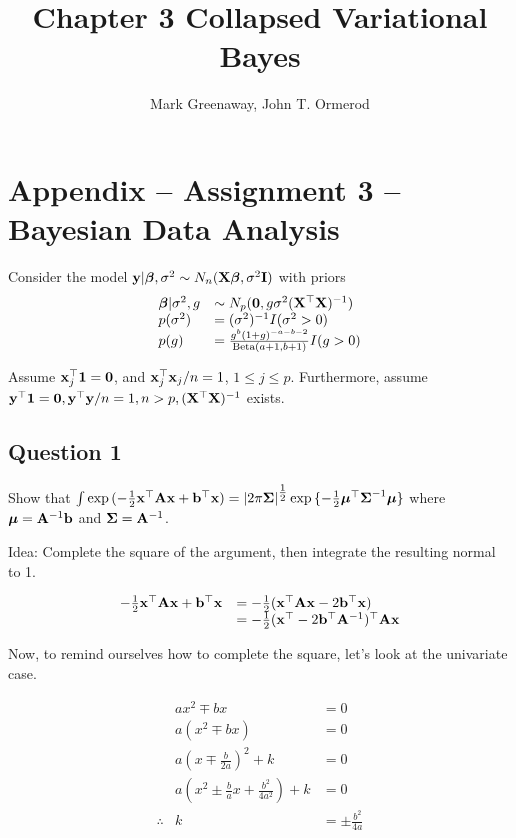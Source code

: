 \documentclass{amsart}[12pt]
\title{Chapter 3 Collapsed Variational Bayes}
\author{Mark Greenaway, John T. Ormerod}
\begin{document}
\section{Appendix -- Assignment 3 -- Bayesian Data Analysis}

Consider the model ${\bf y} | {\boldsymbol \beta}, \sigma^2 \sim N_n({\bf X} {\boldsymbol \beta}, \sigma^2 {\bf I})$ with priors
\begin{equation*}
\begin{array}{ll}
{\boldsymbol\beta} | \sigma^2, g &\sim N_p({\bf 0}, g \sigma^2({\bf X}^\top {\bf X})^{-1}) \\
p(\sigma^2) &= (\sigma^2)^{-1} I(\sigma^2 > 0) \\
p(g) &= \frac{g^b (1 + g)^{-a - b - 2}}{\text{Beta}(a + 1, b + 1)} I(g > 0)
\end{array}
\end{equation*}

Assume ${\bf x}_j^\top{\bf1} = {\bf 0}$, and ${\bf x}_j^\top {\bf x}_j / n = 1$, $1 \leq j \leq p$.
Furthermore, assume ${\bf y}^\top {\bf1} = {\bf 0}, {\bf y}^\top {\bf y} / n  = 1, n > p, ({\bf X}^\top {\bf X})^{-1}$ exists.

\subsection{Question 1}

Show that $\int \exp{(- \tfrac{1}{2} {\bf x}^\top {\bf A}{\bf x}+ {\bf b}^\top {\bf x})} = |2 \pi {\boldsymbol\Sigma}|^{\tfrac{1}{2}} \exp{\{ - \tfrac{1}{2} {\boldsymbol\mu}^\top {\boldsymbol\Sigma}^{-1} {\boldsymbol\mu}\}}$ where ${\boldsymbol \mu} = {\bf A}^{-1} {\bf b}$ and ${\boldsymbol \Sigma} = {\bf A}^{-1}$.

Idea: Complete the square of the argument, then integrate the resulting normal to 1.

\begin{equation*}
\begin{array}{ll}
-\tfrac{1}{2} {\bf x}^\top {\bf A} {\bf x} + {\bf b}^\top {\bf x} &= -\tfrac{1}{2} ({\bf x}^\top {\bf A} {\bf x} - 2 {\bf b}^\top {\bf x}) \\
&= -\tfrac{1}{2} ({\bf x}^\top - 2 {\bf b}^\top {\bf A}^{-1})^\top {\bf A} {\bf x}
\end{array}
\end{equation*}

Now, to remind ourselves how to complete the square, let's look at the univariate case.

\begin{equation*}
\begin{array}{rcl}
& ax^2 \mp bx &= 0 \\
& a(x^2 \mp bx) &= 0 \\
& a(x \mp \frac{b}{2a})^2 + k &= 0 \\
& a(x^2 \pm \frac{b}{a} x + \frac{b^2}{4a^2}) + k &= 0 \\
\therefore & k &= \pm \frac{b^2}{4a}
\end{array}
\end{equation*}
\end{document}
